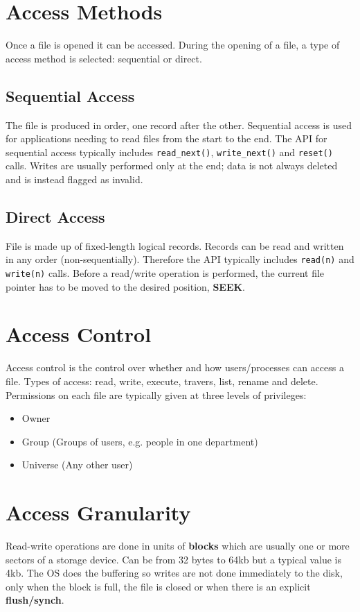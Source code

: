\documentclass[11pt]{article}
\begin{document}
\section{Access Methods}
\label{sec:orgb36ab2d}
Once a file is opened it can be accessed.
During the opening of a file, a type of access method is selected: sequential or direct.

\subsection{Sequential Access}
\label{sec:org71aab54}
The file is produced in order, one record after the other.
Sequential access is used for applications needing to read files from the start to the end.
The API for sequential access typically includes \texttt{read\_next()}, \texttt{write\_next()} and \texttt{reset()} calls.
Writes are usually performed only at the end; data is not always deleted and is instead flagged as invalid.

\subsection{Direct Access}
\label{sec:orgceaf9a5}
File is made up of fixed-length logical records.
Records can be read and written in any order (non-sequentially).
Therefore the API typically includes \texttt{read(n)} and \texttt{write(n)} calls.
Before a read/write operation is performed, the current file pointer has to be moved to the desired position, \textbf{SEEK}.

\section{Access Control}
\label{sec:org23fbce2}
Access control is the control over whether and how users/processes can access a file.
Types of access: read, write, execute, travers, list, rename and delete.
Permissions on each file are typically given at three levels of privileges:
\begin{itemize}
\item Owner
\item Group (Groups of users, e.g. people in one department)
\item Universe (Any other user)
\end{itemize}

\section{Access Granularity}
\label{sec:org5d6820c}
Read-write operations are done in units of \textbf{blocks} which are usually one or more sectors of a storage device.
Can be from 32 bytes to 64kb but a typical value is 4kb.
The OS does the buffering so writes are not done immediately to the disk, only when the block is full, the file is closed or when there is an explicit \textbf{flush/synch}.
\end{document}
